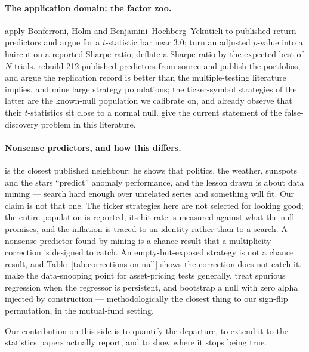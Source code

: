 \documentclass{article}
\begin{document}
\paragraph{The application domain: the factor zoo.}
\citet{harvey2016} apply Bonferroni, Holm and Benjamini--Hochberg--Yekutieli to
published return predictors and argue for a $t$-statistic bar near 3.0;
\citet{harvey2015backtesting} turn an adjusted $p$-value into a haircut on a
reported Sharpe ratio; \citet{bailey2014} deflate a Sharpe ratio by the
expected best of $N$ trials. \citet{chen2022osap} rebuild 212 published
predictors from source and publish the portfolios, and \citet{jensen2023} argue
the replication record is better than the multiple-testing literature implies.
\citet{yan2017} and \citet{chen2025htap} mine large strategy populations; the
ticker-symbol strategies of the latter are the known-null population we
calibrate on, and \citeauthor{chen2025htap} already observe that their
$t$-statistics sit close to a normal null. \citet{harveyliu2020} give the
current statement of the false-discovery problem in this literature.

\paragraph{Nonsense predictors, and how this differs.}
\citet{novymarx2014} is the closest published neighbour: he shows that
politics, the weather, sunspots and the stars ``predict'' anomaly performance,
and the lesson drawn is about data mining --- search hard enough over
unrelated series and something will fit. Our claim is not that one. The ticker
strategies here are not selected for looking good; the entire population is
reported, its hit rate is measured against what the null promises, and the
inflation is traced to an identity rather than to a search. A nonsense
predictor found by mining is a chance result that a multiplicity correction is
designed to catch. An empty-but-exposed strategy is not a chance result, and
Table~\ref{tab:corrections-on-null} shows the correction does not catch it.
\citet{lomackinlay1990} make the data-snooping point for asset-pricing tests
generally, \citet{ferson2003} treat spurious regression when the regressor is
persistent, and \citet{famafrench2010} bootstrap a null with zero alpha
injected by construction --- methodologically the closest thing to our
sign-flip permutation, in the mutual-fund setting.

Our contribution on this side is to quantify the departure, to extend it to the
statistics papers actually report, and to show where it stops being true.
\end{document}
